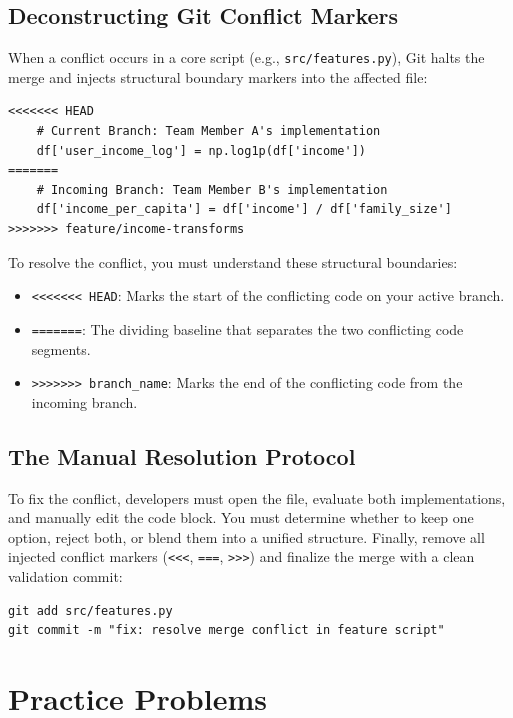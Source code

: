 \documentclass{article}
\begin{document}
\subsection{Deconstructing Git Conflict Markers}
When a conflict occurs in a core script (e.g., \texttt{src/features.py}), Git halts the merge and injects structural boundary markers into the affected file:
\begin{verbatim}
<<<<<<< HEAD
    # Current Branch: Team Member A's implementation
    df['user_income_log'] = np.log1p(df['income'])
=======
    # Incoming Branch: Team Member B's implementation
    df['income_per_capita'] = df['income'] / df['family_size']
>>>>>>> feature/income-transforms
\end{verbatim}

To resolve the conflict, you must understand these structural boundaries:
\begin{itemize}
    \item \texttt{<<<<<<< HEAD}: Marks the start of the conflicting code on your active branch.
    \item \texttt{=======}: The dividing baseline that separates the two conflicting code segments.
    \item \texttt{>>>>>>> branch\_name}: Marks the end of the conflicting code from the incoming branch.
\end{itemize}

\subsection{The Manual Resolution Protocol}
To fix the conflict, developers must open the file, evaluate both implementations, and manually edit the code block. You must determine whether to keep one option, reject both, or blend them into a unified structure. Finally, remove all injected conflict markers (\texttt{<<<}, \texttt{===}, \texttt{>>>}) and finalize the merge with a clean validation commit:
\begin{verbatim}
git add src/features.py
git commit -m "fix: resolve merge conflict in feature script"
\end{verbatim}

\newpage
\section{Practice Problems}
\end{document}
